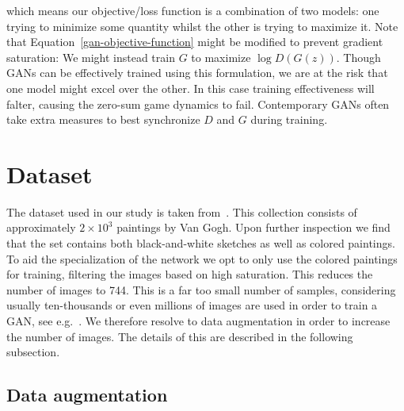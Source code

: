 \documentclass{article}
\begin{document}
which means our objective/loss function is a combination of two models: one trying to minimize some quantity whilst the other is trying to maximize it. Note that Equation~\ref{gan-objective-function} might be modified to prevent gradient saturation: We might instead train $G$ to maximize $\log D(G(z))$. Though GANs can be effectively trained using this formulation, we are at the risk that one model might excel over the other. In this case training effectiveness will falter, causing the zero-sum game dynamics to fail. Contemporary GANs often take extra measures to best synchronize $D$ and $G$ during training.

\section{Dataset}

The dataset used in our study is taken from~\cite{kaggle_van_gogh}. This collection consists of approximately $2 \times 10^3$ paintings by Van Gogh. Upon further inspection we find that the set contains both black-and-white sketches as well as colored paintings. To aid the specialization of the network we opt to only use the colored paintings for training, filtering the images based on high saturation. This reduces the number of images to 744. This is a far too small number of samples, considering usually ten-thousands or even millions of images are used in order to train a GAN, see e.g.~\cite{radford2015unsupervised}. We therefore resolve to data augmentation in order to increase the number of images. The details of this are described in the following subsection.

\subsection{Data augmentation}
\end{document}
